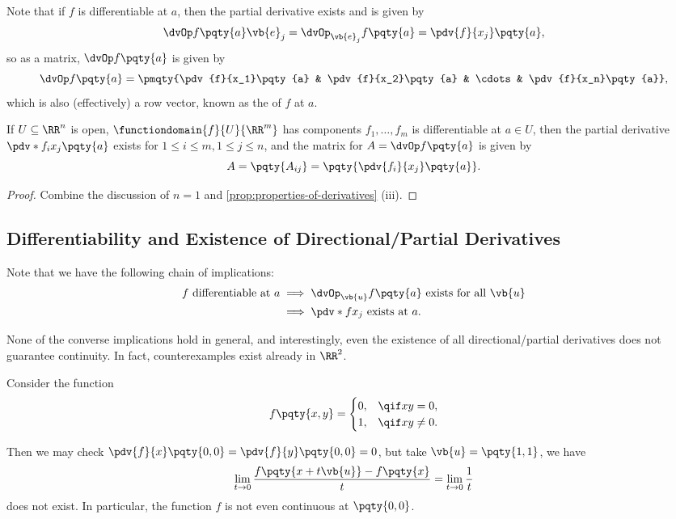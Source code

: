 Note that if \(f\) is differentiable at \(a\), then the partial derivative exists and is given by
\[
    \dvOp f\pqty{a} \vb{e}_j = \dvOp_{\vb{e}_j} f\pqty{a} = \pdv{f}{x_j}\pqty{a},
\]
so as a matrix, \(\dvOp f\pqty{a}\) is given by
\[
    \dvOp f\pqty{a} = \pmqty{\pdv{f}{x_1}\pqty{a} & \pdv{f}{x_2}\pqty{a} & \cdots & \pdv{f}{x_n}\pqty{a}},
\]
which is also (effectively) a row vector, known as the  of \(f\) at \(a\).

\begin{proposition}
    If \(U \subseteq \RR^n\) is open, \(\functiondomain{f}{U}{\RR^m}\) has components \(f_1, \ldots, f_m\) is differentiable at \(a \in U\), then the partial derivative \(\pdv*{f_i}{x_j} \pqty{a}\) exists for \(1 \leq i \leq m, 1 \leq j \leq n\), and the matrix for \(A = \dvOp f\pqty{a}\) is given by
    \[
        A = \pqty{A_{ij}} = \pqty{\pdv{f_i}{x_j}\pqty{a}}.
    \]
\end{proposition}

\begin{proof}
    Combine the discussion of \(n = 1\) and \autoref{prop:properties-of-derivatives} (iii).
\end{proof}

\subsection{Differentiability and Existence of Directional/Partial Derivatives}

Note that we have the following chain of implications:
\begin{align*}
    f \text{ differentiable at } a &\implies \dvOp_{\vb{u}} f\pqty{a} \text{ exists for all } \vb{u} \\
    &\implies \pdv*{f}{x_j} \text{ exists at } a.
\end{align*}

None of the converse implications hold in general, and interestingly, even the existence of all directional/partial derivatives does not guarantee continuity. In fact, counterexamples exist already in \(\RR^2\).

\begin{example}
    Consider the function
    \[
        f\pqty{x, y} = \begin{cases}
            0, & \qif xy = 0, \\
            1, & \qif xy \neq 0.
        \end{cases}
    \]

    Then we may check \(\pdv{f}{x} \pqty{0, 0} = \pdv{f}{y} \pqty{0, 0} = 0\), but take \(\vb{u} = \pqty{1, 1}\), we have
    \[
        \lim_{t \to 0} \frac{f \pqty{x + t \vb{u}} - f\pqty{x}}{t} = \lim_{t \to 0} \frac{1}{t}
    \]
    does not exist. In particular, the function \(f\) is not even continuous at \(\pqty{0, 0}\).
\end{example}

